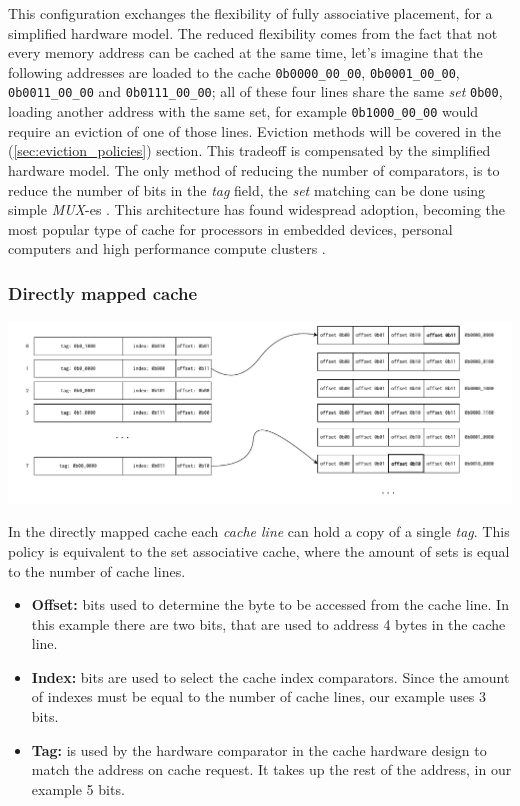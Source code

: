 \noindent This configuration exchanges the flexibility of fully associative placement, for a simplified hardware model. The reduced flexibility comes from the fact that
not every memory address can be cached at the same time, let's imagine that the following addresses are loaded to the cache \texttt{0b0000\_00\_00}, \texttt{0b0001\_00\_00}, \texttt{0b0011\_00\_00}
and \texttt{0b0111\_00\_00}; all of these four lines share the same \textit{set} \texttt{0b00}, loading another address with the same set, for example \texttt{0b1000\_00\_00} would require 
an eviction of one of those lines. Eviction methods will be covered in the (\ref{sec:eviction_policies}) section. 
This tradeoff is compensated by the simplified hardware model. The only method of reducing the number of comparators, is to reduce the number of bits in the \textit{tag} field, the \textit{set}
matching can be done using simple \textit{MUX}-es \cite{whatevery}.
This architecture has found widespread adoption, becoming the most popular type of cache for processors in embedded devices, personal computers and high performance compute clusters
\cite{digitaldesgnandcomp, evalofcaceh}.

\subsubsection{Directly mapped cache}
\begin{center}
	\centering
	\includegraphics[width=\textwidth]{figures/02-background/dir_map_mem.pdf}
	\label{fig:dir_map_mem}
\end{center}

\noindent In the directly mapped cache each \textit{cache line} can hold a copy of a single \textit{tag}. This policy is equivalent to the set associative cache, where the amount of sets is equal to
the number of cache lines.

\begin{itemize}
	\item \textbf{Offset:} bits used to determine the byte to be accessed from the cache line. In this example there are two bits, that are used to address 4 bytes in the cache line.
	\item \textbf{Index:}  bits are used to select the cache index comparators. Since the amount of indexes must be equal to the number of cache lines, our example uses 3 bits.
	\item \textbf{Tag:} is used by the hardware comparator in the cache hardware design to match the address on cache request. It takes up the rest of the address, in our example 5 bits.
\end{itemize}

